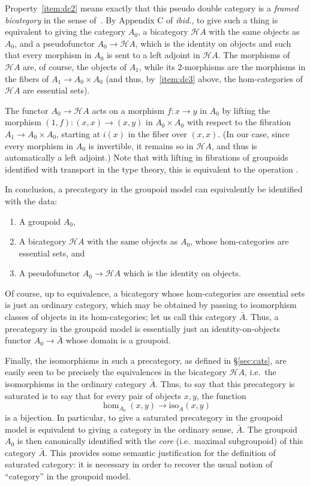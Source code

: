Property~\ref{item:dc2} means exactly that this pseudo double category is a \emph{framed bicategory} in the sense of~\cite{shulman:frbi}.
By Appendix C of \textit{ibid.}, to give such a thing is equivalent to giving the category $A_0$, a bicategory $\mathcal{H}A$ with the same objects as $A_0$, and a pseudofunctor $A_0 \to \mathcal{H}A$, which is the identity on objects and such that every morphism in $A_0$ is sent to a left adjoint in $\mathcal{H}A$.
The morphisms of $\mathcal{H}A$ are, of course, the objects of $A_1$, while its 2-morphisms are the morphisms in the fibers of $A_1 \to A_0\times A_0$ (and thus, by~\ref{item:dc3} above, the hom-categories of $\mathcal{H}A$ are essential sets).

The functor $A_0 \to \mathcal{H}A$ acts on a morphism $f:x\to y$ in $A_0$ by lifting the morphism $(1,f):(x,x)\to (x,y)$ in $A_0\times A_0$ with respect to the fibration $A_1 \to A_0\times A_0$, starting at $i(x)$ in the fiber over $(x,x)$.
(In our case, since every morphism in $A_0$ is invertible, it remains so in $\mathcal{H}A$, and thus is automatically a left adjoint.)
Note that with lifting in fibrations of groupoids identified with transport in the type theory, this is equivalent to the operation \idtoiso.

In conclusion, a precategory in the groupoid model can equivalently be identified with the data:
\begin{enumerate}
\item A groupoid $A_0$,
\item A bicategory $\mathcal{H}A$ with the same objects as $A_0$, whose hom-categories are essential sets, and
\item A pseudofunctor $A_0 \to \mathcal{H}A$ which is the identity on objects.
\end{enumerate}
Of course, up to equivalence, a bicategory whose hom-categories are essential sets is just an ordinary category, which may be obtained by passing to isomorphism classes of objects in its hom-categories; let us call this category $\bar A$.
Thus, a precategory in the groupoid model is essentially just an identity-on-objects functor $A_0 \to \bar A$ whose domain is a groupoid.

Finally, the isomorphisms in such a precategory, as defined in \S\ref{sec:cats}, are easily seen to be precisely the equivalences in the bicategory $\mathcal{H}A$, i.e.\ the isomorphisms in the ordinary category $\bar A$.
Thus, to say that this precategory is saturated is to say that for every pair of objects $x,y$, the function
\[ \hom_{A_0}(x,y) \to \mathrm{iso}_{\bar A}(x,y) \]
is a bijection.
In particular, to give a saturated precategory in the groupoid model is equivalent to giving a category in the ordinary sense, $\bar A$.
The groupoid $A_0$ is then canonically identified with the \emph{core} (i.e.\ maximal subgroupoid) of this category $\bar A$.
This provides some semantic justification for the definition of saturated category: it is necessary in order to recover the usual notion of ``category'' in the groupoid model.

